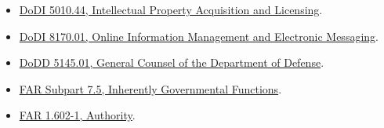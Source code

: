 \documentclass[11pt]{article}
\begin{document}
\begin{itemize}
  \href{https://www.esd.whs.mil/Portals/54/Documents/DD/issuances/dodi/540016p.pdf}{DoDI
  5400.16, DoD Privacy Impact Assessment Guidance}.
\item
  \href{https://www.esd.whs.mil/Portals/54/Documents/DD/issuances/dodi/501044p.pdf}{DoDI
  5010.44, Intellectual Property Acquisition and Licensing}.
\item
  \href{https://www.esd.whs.mil/Portals/54/Documents/DD/issuances/dodi/817001p.pdf}{DoDI
  8170.01, Online Information Management and Electronic Messaging}.
\item
  \href{https://www.esd.whs.mil/Portals/54/Documents/DD/issuances/dodd/514501p.pdf}{DoDD
  5145.01, General Counsel of the Department of Defense}.
\item
  \href{https://www.acquisition.gov/far/subpart-7.5}{FAR Subpart 7.5,
  Inherently Governmental Functions}.
\item
  \href{https://www.acquisition.gov/far/1.602-1}{FAR 1.602-1,
  Authority}.
\end{itemize}
\end{document}
